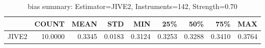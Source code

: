 \begin{table}[ht]
\centering
\caption{bias summary: Estimator=JIVE2, Instruments=142, Strength=0.70}
\begin{tabular}{lrrrrrrrr}
\toprule
 & COUNT & MEAN & STD & MIN & 25\% & 50\% & 75\% & MAX \\
\midrule
JIVE2 & 10.0000 & 0.3345 & 0.0183 & 0.3124 & 0.3253 & 0.3288 & 0.3410 & 0.3764 \\
\bottomrule
\end{tabular}
\end{table}

